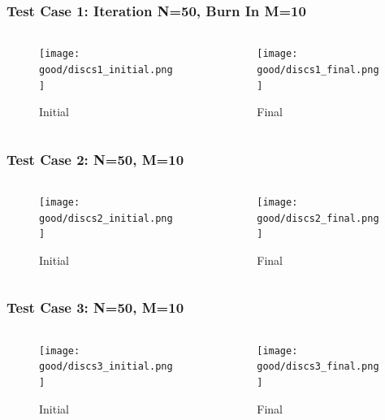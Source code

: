 \documentclass[11pt]{beamer}
\begin{document}
\begin{frame}
\frametitle{Test Case 1: Iteration N=50, Burn In M=10}
\begin{columns}
\begin{column}{.45\textwidth}
\begin{figure}
  \texttt{[image: good/discs1\_initial.png]}
  \caption{Initial}
\end{figure}
\end{column}
\begin{column}{.45\textwidth}
\begin{figure}
  \texttt{[image: good/discs1\_final.png]}
  \caption{Final}
\end{figure}
\end{column}
\end{columns}
\end{frame}

\begin{frame}
\frametitle{Test Case 2: N=50, M=10}
\begin{columns}
\begin{column}{.45\textwidth}
\begin{figure}
  \texttt{[image: good/discs2\_initial.png]}
  \caption{Initial}
\end{figure}
\end{column}
\begin{column}{.45\textwidth}
\begin{figure}
  \texttt{[image: good/discs2\_final.png]}
  \caption{Final}
\end{figure}
\end{column}
\end{columns}
\end{frame}

\begin{frame}
\frametitle{Test Case 3: N=50, M=10}
\begin{columns}
\begin{column}{.45\textwidth}
\begin{figure}
  \texttt{[image: good/discs3\_initial.png]}
  \caption{Initial}
\end{figure}
\end{column}
\begin{column}{.45\textwidth}
\begin{figure}
  \texttt{[image: good/discs3\_final.png]}
  \caption{Final}
\end{figure}
\end{column}
\end{columns}
\end{frame}
\end{document}
